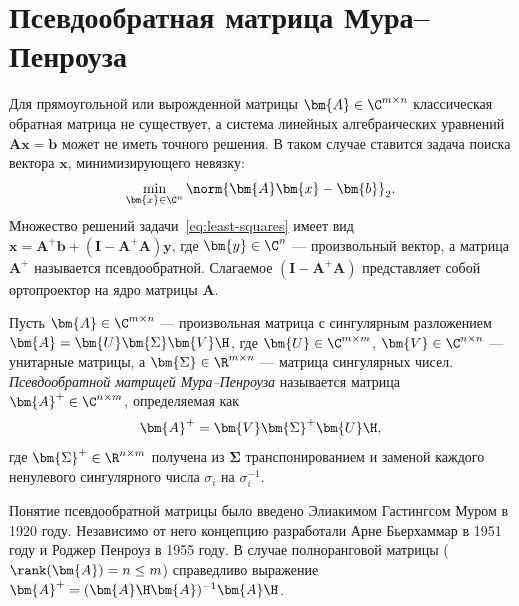 \section{Псевдообратная матрица Мура--Пенроуза}
\label{sec:pseudo-inverse}

Для прямоугольной или вырожденной матрицы $\bm{A} \in \C^{m \times n}$ классическая обратная матрица не существует, а система линейных алгебраических уравнений $\bm{A}\bm{x} = \bm{b}$ может не иметь точного решения. В таком случае ставится задача поиска вектора $\bm{x}$, минимизирующего невязку:
\begin{equation}
    \min_{\bm{x} \in \C^n} \norm{\bm{A}\bm{x} - \bm{b}}_2.
    \label{eq:least-squares}
\end{equation}
Множество решений задачи~\cref{eq:least-squares} имеет вид $\bm{x} = \bm{A}^+ \bm{b} + (\bm{I} - \bm{A}^+ \bm{A})\bm{y}$, где $\bm{y} \in \C^n$ — произвольный вектор, а матрица $\bm{A}^+$ называется псевдообратной. Слагаемое $(\bm{I} - \bm{A}^+ \bm{A})$ представляет собой ортопроектор на ядро матрицы $\bm{A}$.

\begin{tcbdefinition}
\label{def:pinv-svd}
    Пусть $\bm{A} \in \C^{m \times n}$ — произвольная матрица с сингулярным разложением $\bm{A} = \bm{U}\bm{\Sigma}\bm{V}\H$, где $\bm{U} \in \C^{m \times m}$, $\bm{V} \in \C^{n \times n}$ — унитарные матрицы, а $\bm{\Sigma} \in \R^{m \times n}$ — матрица сингулярных чисел. \textit{Псевдообратной матрицей Мура--Пенроуза} называется матрица $\bm{A}^+ \in \C^{n \times m}$, определяемая как
    \begin{equation}
        \bm{A}^+ = \bm{V}\bm{\Sigma}^+\bm{U}\H,
        \label{eq:pinv-svd}
    \end{equation}
    где $\bm{\Sigma}^+ \in \R^{n \times m}$ получена из $\bm{\Sigma}$ транспонированием и заменой каждого ненулевого сингулярного числа $\sigma_i$ на $\sigma_i^{-1}$.
\end{tcbdefinition}

\begin{tcbremark}
    Понятие псевдообратной матрицы было введено Элиакимом Гастингсом Муром в 1920 году. Независимо от него концепцию разработали Арне Бьерхаммар в 1951 году и Роджер Пенроуз в 1955 году. В случае полноранговой матрицы ($\rank(\bm{A}) = n \leq m$) справедливо выражение $\bm{A}^+ = (\bm{A}\H\bm{A})^{-1}\bm{A}\H$.
\end{tcbremark}

